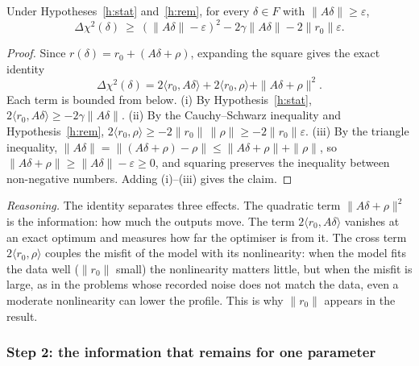 \begin{slemma}\label{l:lower}
Under Hypotheses~\ref{h:stat} and~\ref{h:rem}, for every $\delta\in F$ with $\|A\delta\|\ge\varepsilon$,
\[ \Delta\chi^2(\delta)\ \ge\ (\|A\delta\|-\varepsilon)^2-2\gamma\|A\delta\|-2\|r_0\|\varepsilon . \]
\end{slemma}
\begin{proof}
Since $r(\delta)=r_0+(A\delta+\rho)$, expanding the square gives the exact identity
\[ \Delta\chi^2(\delta)=2\langle r_0,A\delta\rangle+2\langle r_0,\rho\rangle+\|A\delta+\rho\|^2 . \]
Each term is bounded from below. (i) By Hypothesis~\ref{h:stat}, $2\langle r_0,A\delta\rangle\ge-2\gamma\|A\delta\|$. (ii) By the Cauchy--Schwarz inequality and Hypothesis~\ref{h:rem}, $2\langle r_0,\rho\rangle\ge-2\|r_0\|\,\|\rho\|\ge-2\|r_0\|\varepsilon$. (iii) By the triangle inequality, $\|A\delta\|=\|(A\delta+\rho)-\rho\|\le\|A\delta+\rho\|+\|\rho\|$, so $\|A\delta+\rho\|\ge\|A\delta\|-\varepsilon\ge0$, and squaring preserves the inequality between non-negative numbers. Adding (i)--(iii) gives the claim.
\end{proof}
\emph{Reasoning.} The identity separates three effects. The quadratic term $\|A\delta+\rho\|^2$ is the information: how much the outputs move. The term $2\langle r_0,A\delta\rangle$ vanishes at an exact optimum and measures how far the optimiser is from it. The cross term $2\langle r_0,\rho\rangle$ couples the misfit of the model with its nonlinearity: when the model fits the data well ($\|r_0\|$ small) the nonlinearity matters little, but when the misfit is large, as in the problems whose recorded noise does not match the data, even a moderate nonlinearity can lower the profile. This is why $\|r_0\|$ appears in the result.

\subsubsection*{Step 2: the information that remains for one parameter}

